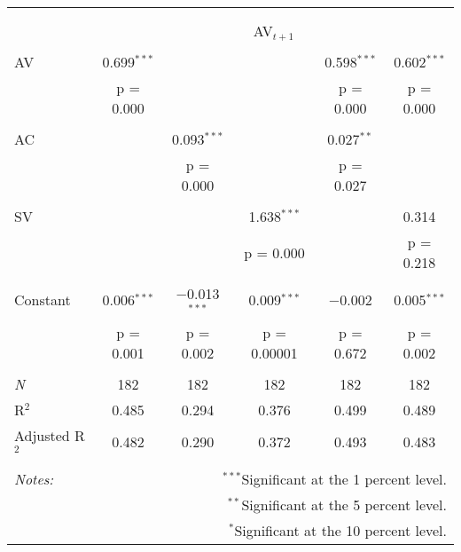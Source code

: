 
\begin{tabular}{@{\extracolsep{5pt}}lccccc} 
\\[-1.8ex]\hline 
\hline \\[-1.8ex] 
\\[-1.8ex] & \multicolumn{5}{c}{AV$_{t+1}$} \\ 
\hline \\[-1.8ex] 
 AV & 0.699$^{***}$ &  &  & 0.598$^{***}$ & 0.602$^{***}$ \\ 
  & p = 0.000 &  &  & p = 0.000 & p = 0.000 \\ 
  & & & & & \\ 
 AC &  & 0.093$^{***}$ &  & 0.027$^{**}$ &  \\ 
  &  & p = 0.000 &  & p = 0.027 &  \\ 
  & & & & & \\ 
 SV &  &  & 1.638$^{***}$ &  & 0.314 \\ 
  &  &  & p = 0.000 &  & p = 0.218 \\ 
  & & & & & \\ 
 Constant & 0.006$^{***}$ & $-$0.013$^{***}$ & 0.009$^{***}$ & $-$0.002 & 0.005$^{***}$ \\ 
  & p = 0.001 & p = 0.002 & p = 0.00001 & p = 0.672 & p = 0.002 \\ 
  & & & & & \\ 
\textit{N} & 182 & 182 & 182 & 182 & 182 \\ 
R$^{2}$ & 0.485 & 0.294 & 0.376 & 0.499 & 0.489 \\ 
Adjusted R$^{2}$ & 0.482 & 0.290 & 0.372 & 0.493 & 0.483 \\ 
\hline 
\hline \\[-1.8ex] 
\textit{Notes:} & \multicolumn{5}{r}{$^{***}$Significant at the 1 percent level.} \\ 
 & \multicolumn{5}{r}{$^{**}$Significant at the 5 percent level.} \\ 
 & \multicolumn{5}{r}{$^{*}$Significant at the 10 percent level.} \\ 
\end{tabular} 
